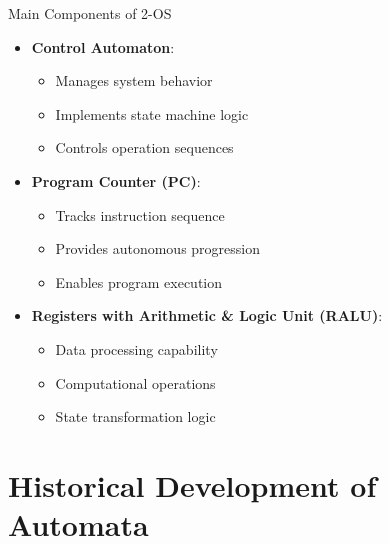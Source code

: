 \documentclass[aspectratio=169,11pt]{beamer}
\newcommand{\concept}[1]{\textbf{\color{accentcolor}#1}}
\begin{document}
\begin{frame}{Main Components of 2-OS}
\begin{itemize}
\item \concept{Control Automaton}:
\begin{itemize}
\item Manages system behavior
\item Implements state machine logic
\item Controls operation sequences
\end{itemize}
\vspace{0.5cm}
\item \concept{Program Counter (PC)}:
\begin{itemize}
\item Tracks instruction sequence
\item Provides autonomous progression
\item Enables program execution
\end{itemize}
\vspace{0.5cm}
\item \concept{Registers with Arithmetic \& Logic Unit (RALU)}:
\begin{itemize}
\item Data processing capability
\item Computational operations
\item State transformation logic
\end{itemize}
\end{itemize}
\end{frame}

\section{Historical Development of Automata}
\end{document}
